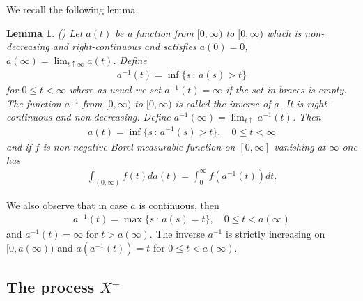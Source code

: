 \documentclass[11pt,a4paper]{article}
\newtheorem{lemma}{Lemma}
\begin{document}
We recall the following lemma.
\begin{lemma}
\label{lemmaBluGet}
(\cite[Lemma 2.2, Chapter V]{BluGet68}) Let $a(t)$ be a function from $[0, \infty)$ to $[0, \infty)$ which is non-decreasing and right-continuous and satisfies $a(0)=0$, $a(\infty)=\lim_{t\uparrow \infty} a(t)$. Define
\begin{align*}
a^{-1}(t) = \inf\{s\,:\, a(s)>t \}
\end{align*}
for $0\leq t < \infty$ where as usual we set $a^{-1}(t)=\infty$ if the set in braces is empty. The function $a^{-1}$ from $[0, \infty)$ to $[0, \infty)$ is called the inverse of $a$. It is right-continuous and non-decreasing. Define $a^{-1}(\infty) = \lim_{t \uparrow} a^{-1}(t)$. Then
\begin{align*}
a(t) = \inf\{s\,:\, a^{-1}(s) > t\}, \quad 0 \leq t < \infty
\end{align*}
and if $f$ is non negative Borel measurable function on $[0, \infty]$ vanishing at $\infty$ one has
\begin{align*}
\int_{(0, \infty)} f(t) da(t) = \int_0^\infty f(a^{-1}(t)) dt.
\end{align*}
\end{lemma}
We also observe that in case $a$ is continuous, then
\begin{align*}
a^{-1}(t) = \max\{s\,:\, a(s)=t\}, \quad 0 \leq t < a(\infty)
\end{align*} 
and $a^{-1}(t)=\infty$ for $t> a(\infty)$. The inverse $a^{-1}$ is strictly increasing on $[0, a(\infty))$ and $a(a^{-1}(t)) = t$ for $0 \leq t < a(\infty)$. 



\subsection{The process $X^+$}
\label{sec:secXref}
\end{document}
